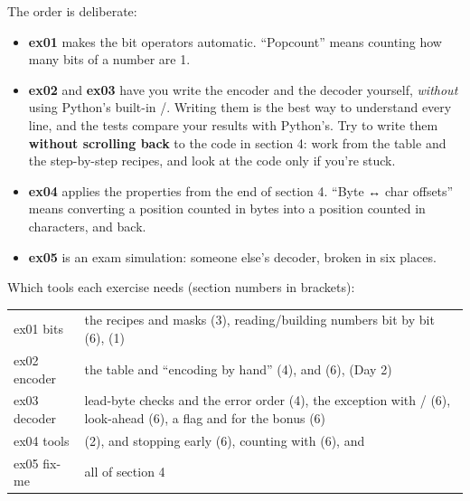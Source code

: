 \documentclass[10pt,a4paper]{article}
\begin{document}
The order is deliberate:
\begin{itemize}
\item \textbf{ex01} makes the bit operators automatic. “Popcount” means counting how many bits of a number are 1.
\item \textbf{ex02} and \textbf{ex03} have you write the encoder and the decoder yourself, \emph{without} using Python’s built-in /. Writing them is the best way to understand every line, and the tests compare your results with Python’s. Try to write them \textbf{without scrolling back} to the code in section 4: work from the table and the step-by-step recipes, and look at the code only if you’re stuck.
\item \textbf{ex04} applies the properties from the end of section 4. “Byte ↔ char offsets” means converting a position counted in bytes into a position counted in characters, and back.
\item \textbf{ex05} is an exam simulation: someone else’s decoder, broken in six places.
\end{itemize}
Which tools each exercise needs (section numbers in brackets):
\begin{datatable}{}{\footnotesize}
\begin{xltabular}{\linewidth}{@{}Y{0.40}Y{1.60}@{}}
 &  \\ \hline
\endhead
ex01 bits & the recipes and masks (3), reading/building numbers bit by bit (6),  (1) \\
ex02 encoder & the table and “encoding by hand” (4),  and  (6),  (Day 2) \\
ex03 decoder & lead-byte checks and the error order (4), the exception with / (6),  look-ahead (6), a flag and  for the bonus (6) \\
ex04 tools &  (2),  and stopping early (6), counting with  (6),  and  \\
ex05 fix-me & all of section 4 \\
\hline
\end{xltabular}
\end{datatable}
\end{document}
